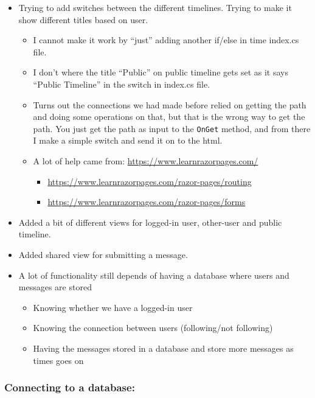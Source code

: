 \begin{itemize}
    \item Trying to add switches between the different timelines. Trying to make it show different titles based on user.

    \begin{itemize}
        \item I cannot make it work by ``just'' adding another if/else in time index.cs file.
        \item I don't where the title ``Public'' on public timeline gets set as it says ``Public Timeline'' in the switch in index.cs file.
        \item Turns out the connections we had made before relied on getting the path and doing some operations on that, but that is the wrong way to get the path. You just get the path as input to the \texttt{OnGet} method, and from there I make a simple switch and send it on to the html.
        \item A lot of help came from: \url{https://www.learnrazorpages.com/}

        \begin{itemize}
            \item \url{https://www.learnrazorpages.com/razor-pages/routing}
            \item \url{https://www.learnrazorpages.com/razor-pages/forms}
        \end{itemize}
    \end{itemize}

    \item Added a bit of different views for logged-in user, other-user and public timeline.
    \item Added shared view for submitting a message.
    \item A lot of functionality still depends of having a database where users and messages are stored

    \begin{itemize}
        \item Knowing whether we have a logged-in user
        \item Knowing the connection between users (following/not following)
        \item Having the messages stored in a database and store more messages as times goes on
    \end{itemize}
\end{itemize}

\subsubsection{Connecting to a
database:}
\label{log:connecting-to-a-database}

